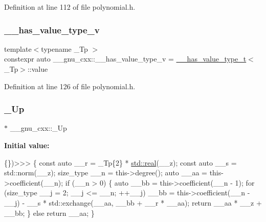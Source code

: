 Definition at line 112 of file polynomial.\+h.

\mbox{\label{namespace____gnu__cxx_a5ec7bbecf1d944f8aa448f873584cf98}} 
\subsubsection{\texorpdfstring{\+\_\+\+\_\+has\+\_\+value\+\_\+type\+\_\+v}{\_\_has\_value\_type\_v}}
{\footnotesize\ttfamily template$<$typename \+\_\+\+Tp $>$ \\
constexpr auto \+\_\+\+\_\+gnu\+\_\+cxx\+::\+\_\+\+\_\+has\+\_\+value\+\_\+type\+\_\+v = \hyperlink{struct____gnu__cxx_1_1____has__value__type__t}{\+\_\+\+\_\+has\+\_\+value\+\_\+type\+\_\+t}$<$\+\_\+\+Tp$>$\+::value}



Definition at line 126 of file polynomial.\+h.

\mbox{\label{namespace____gnu__cxx_ab693ea357b6429b331e0bf09f9442385}} 
\subsubsection{\texorpdfstring{\+\_\+\+Up}{\_Up}}
{\footnotesize\ttfamily $\ast$ \+\_\+\+\_\+gnu\+\_\+cxx\+::\+\_\+\+Up}

{\bfseries Initial value\+:}
\begin{DoxyCode}
\{\})>>>
      \{
        \textcolor{keyword}{const} \textcolor{keyword}{auto} \_\_r = \_Tp\{2\} * \hyperlink{namespace____gnu__cxx_a2743043701f8e4c87d3f0f06ddb11348}{std::real}(\_\_z);
        \textcolor{keyword}{const} \textcolor{keyword}{auto} \_\_s = std::norm(\_\_z);
        size\_type \_\_n = this->degree();
        \textcolor{keyword}{auto} \_\_aa = this->coefficient(\_\_n);
        \textcolor{keywordflow}{if} (\_\_n > 0)
          \{
            \textcolor{keyword}{auto} \_\_bb = this->coefficient(\_\_n - 1);
            \textcolor{keywordflow}{for} (size\_type \_\_j = 2; \_\_j <= \_\_n; ++\_\_j)
              \_\_bb = this->coefficient(\_\_n - \_\_j)
                   - \_\_s * std::exchange(\_\_aa, \_\_bb + \_\_r * \_\_aa);
            \textcolor{keywordflow}{return} \_\_aa * \_\_z + \_\_bb;
          \}
        \textcolor{keywordflow}{else}
          \textcolor{keywordflow}{return} \_\_aa;
      \}
\end{DoxyCode}


